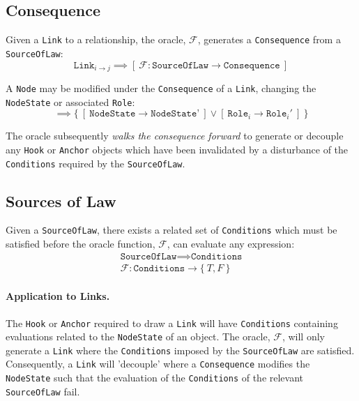 \documentclass{article}
\numberwithin{equation}{section}
\begin{document}
\subsection{Consequence} 

Given a \texttt{Link} to a relationship, the oracle, $\mathcal{F}$, generates a \texttt{Consequence} from a \texttt{SourceOfLaw}:
\begin{equation}
	\texttt{Link}_{i \rightarrow j} \implies [ \ \mathcal{F} : \texttt{SourceOfLaw} \rightarrow \texttt{Consequence} \ ]
\end{equation}

A \texttt{Node} may be modified under the \texttt{Consequence} of a \texttt{Link}, changing the \texttt{NodeState} or associated \texttt{Role}: 
\begin{equation}
	[ \ \mathcal{F}(\texttt{Consequence, Node}) = \texttt{Node'} \ ] \implies \{ \ [ \ \texttt{NodeState} \rightarrow \texttt{NodeState'} \ ] \lor [ \ \texttt{Role}_i \rightarrow \texttt{Role}_i' \ ] \ \}
\end{equation}

The oracle subsequently \textit{walks the consequence forward} to generate or decouple any \texttt{Hook} or \texttt{Anchor} objects which have been invalidated by a disturbance of the \texttt{Conditions} required by the \texttt{SourceOfLaw}.

\subsection{Sources of Law}
Given a \texttt{SourceOfLaw}, there exists a related set of \texttt{Conditions} which must be satisfied before the oracle function, $\mathcal{F}$, can evaluate any expression:
\begin{align}
	\texttt{SourceOfLaw} \implies \texttt{Conditions} \\
	\mathcal{F} : \texttt{Conditions} \rightarrow \{ \ T, F \ \}
\end{align}

\paragraph{Application to Links.} The \texttt{Hook} or \texttt{Anchor} required to draw a \texttt{Link} will have \texttt{Conditions} containing evaluations related to the \texttt{NodeState} of an object. The oracle, $\mathcal{F}$, will only generate a \texttt{Link} where the \texttt{Conditions} imposed by the \texttt{SourceOfLaw} are satisfied. Consequently, a \texttt{Link} will 'decouple' where a \texttt{Consequence} modifies the \texttt{NodeState} such that the evaluation of the \texttt{Conditions} of the relevant \texttt{SourceOfLaw} fail.
\end{document}
